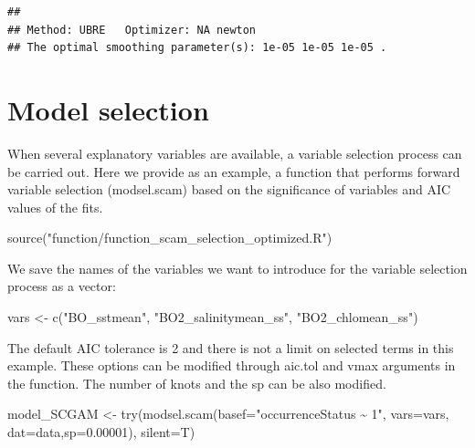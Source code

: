\documentclass[
]{book}
\newenvironment{Shaded}{\begin{snugshade}}{\end{snugshade}}
\newcommand{\AttributeTok}[1]{\textcolor[rgb]{0.77,0.63,0.00}{#1}}
\newcommand{\FloatTok}[1]{\textcolor[rgb]{0.00,0.00,0.81}{#1}}
\newcommand{\FunctionTok}[1]{\textcolor[rgb]{0.00,0.00,0.00}{#1}}
\newcommand{\NormalTok}[1]{#1}
\newcommand{\OtherTok}[1]{\textcolor[rgb]{0.56,0.35,0.01}{#1}}
\newcommand{\StringTok}[1]{\textcolor[rgb]{0.31,0.60,0.02}{#1}}
\begin{document}
\begin{verbatim}
## 
## Method: UBRE   Optimizer: NA newton
## The optimal smoothing parameter(s): 1e-05 1e-05 1e-05 .
\end{verbatim}

\hypertarget{model-selection}{%
\section{Model selection}\label{model-selection}}

When several explanatory variables are available, a variable selection process can be carried out. Here we provide as an example, a function that performs forward variable selection (modsel.scam) based on the significance of variables and AIC values of the fits.

\begin{Shaded}
\begin{Highlighting}[]
\FunctionTok{source}\NormalTok{(}\StringTok{"function/function\_scam\_selection\_optimized.R"}\NormalTok{)}
\end{Highlighting}
\end{Shaded}

We save the names of the variables we want to introduce for the variable selection process as a vector:

\begin{Shaded}
\begin{Highlighting}[]
\NormalTok{vars }\OtherTok{\textless{}{-}} \FunctionTok{c}\NormalTok{(}\StringTok{"BO\_sstmean"}\NormalTok{,}
          \StringTok{"BO2\_salinitymean\_ss"}\NormalTok{,}
          \StringTok{"BO2\_chlomean\_ss"}\NormalTok{)}
\end{Highlighting}
\end{Shaded}

The default AIC tolerance is 2 and there is not a limit on selected terms in this example. These options can be modified through aic.tol and vmax arguments in the function. The number of knots and the sp can be also modified.

\begin{Shaded}
\begin{Highlighting}[]
\NormalTok{model\_SCGAM }\OtherTok{\textless{}{-}} \FunctionTok{try}\NormalTok{(}\FunctionTok{modsel.scam}\NormalTok{(}\AttributeTok{basef=}\StringTok{"occurrenceStatus \textasciitilde{} 1"}\NormalTok{, }\AttributeTok{vars=}\NormalTok{vars, }\AttributeTok{dat=}\NormalTok{data,}\AttributeTok{sp=}\FloatTok{0.00001}\NormalTok{), }\AttributeTok{silent=}\NormalTok{T)  }
\end{Highlighting}
\end{Shaded}
\end{document}
